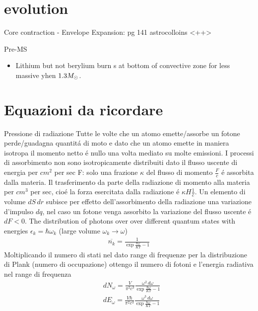 \section{evolution}

\begin{frame}{Core contraction - Envelope Expansion: pg 141 astrocolloins}
    <++>
\end{frame}

\begin{frame}{Pre-MS}
    \begin{itemize}
        \item Lithium but not berylium burn s at bottom of convective zone for less massive yhen $1.3M_{\odot}{}$.
    \end{itemize}
\end{frame}

\section{Equazioni da ricordare}

\begin{frame}{Pressione di radiazione}
Tutte le volte che un atomo emette/assorbe un fotone perde/guadagna quantit\'a di moto e dato che un atomo emette in maniera isotropa il momento netto \'e nullo una volta mediato su molte emissioni.
I processi di assorbimento non sono isotropicamente distribuiti dato il flusso uscente di energia per $cm^2$ per sec F: solo una frazione $\kappa$ del flusso di momento $\frac{F}{c}$ \'e assorbita dalla materia. Il trasferimento da parte della radiazione di momento alla materia per $cm^3$ per sec, cio\'e la forza esercitata dalla radiazione \'e $\kappa H \frac{1}{c}$.
Un elemento di volume $dS\,dr$ subisce per effetto dell'assorbimento della radiazione una variazione d'impulso $dq$, nel caso un fotone venga assorbito la variazione del flusso uscente \'e $dF<0$.
The distribution of photons over over different quantum states with energies $\epsilon_k=\hbar\omega_k$ (large volume $\omega_k\to\omega$)
\begin{align*}
\overline{n_k}=\frac{1}{\exp{\frac{\hbar\omega}{KT}}-1}
\end{align*}
Moltiplicando il numero di stati nel dato range di frequenze per la distribuzione di Plank (numero di occupazione) ottengo il numero di fotoni e l'energia radiativa nel range di frequenza
\begin{align*}
&dN_{\omega}=\frac{V}{\pi^2c^3}\frac{\omega^2\,d\omega}{\exp{\frac{\hbar\omega}{KT}}-1}\\
&dE_{\omega}=\frac{V\hbar}{\pi^2c^3}\frac{\omega^3\,d\omega}{\exp{\frac{\hbar\omega}{KT}}-1}
\end{align*}
\end{frame}

